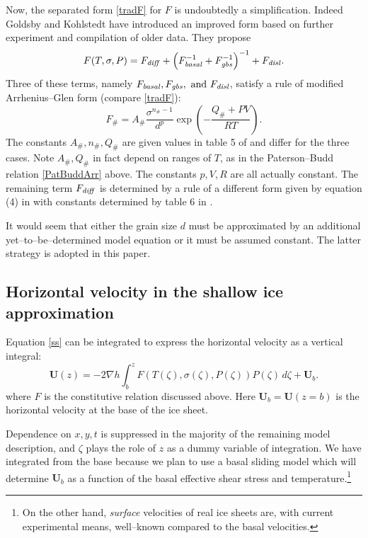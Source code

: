 \documentclass{amsart}%
\theoremstyle{plain}
\theoremstyle{definition}
\theoremstyle{remark}
\newcommand{\grad}{\nabla}
\newcommand{\bU}{{\mathbf{U}}}
\begin{document}
Now, the separated form \eqref{tradF} for $F$ is undoubtedly a simplification.  Indeed Goldsby and Kohlstedt \cite{GoldsbyKohlstedt} have introduced an improved form based on further experiment and compilation of older data.  They propose
\begin{equation}\label{GKF}
F(T,\sigma,P)=F_{\text{\emph{diff}}} + \left(F_{\text{\emph{basal}}}^{-1} + F_{\text{\emph{gbs}}}^{-1}\right)^{-1} +F_{\text{\emph{disl}}}.
\end{equation}
Three of these terms, namely  $F_{\text{\emph{basal}}}, F_{\text{\emph{gbs}}}, \text{ and } F_{\text{\emph{disl}}}$, satisfy a rule of modified Arrhenius--Glen form (compare \eqref{tradF}):
    $$F_{\#}=A_{\#} \frac{\sigma^{n_{\#}-1}}{d^p} \exp\left(-\frac{Q_{\#}+PV}{RT}\right).$$
The constants $A_{\#},n_{\#},Q_{\#}$ are given values in table 5 of \cite{GoldsbyKohlstedt} and differ for the three cases.  Note $A_{\#},Q_{\#}$ in fact depend on ranges of $T$, as in the Paterson--Budd relation \eqref{PatBuddArr} above.  The constants $p, V, R$ are all actually constant.  The remaining term $F_{\text{\emph{diff}}}$ is determined by a rule of a different form given by equation (4) in \cite{GoldsbyKohlstedt} with constants determined by table 6 in \cite{GoldsbyKohlstedt}.

It would seem that either the grain size $d$ must be approximated by an additional yet--to--be--determined model equation or it must be assumed constant.  The latter strategy is adopted in this paper.


\subsection{Horizontal velocity in the shallow ice approximation}\label{ss:horvel}  Equation \eqref{ss} can be integrated to express the horizontal velocity as a vertical integral:
    $$\bU(z) = - 2 \grad h \int_{b}^z F(T(\zeta),\sigma(\zeta),P(\zeta)) P(\zeta)\,d\zeta + \bU_b.$$
where $F$ is the constitutive relation discussed above.  Here $\bU_b=\bU(z=b)$ is the horizontal velocity at the base of the ice sheet.

Dependence on $x,y,t$ is suppressed in the majority of the remaining model description, and $\zeta$ plays the role of $z$ as a dummy variable of integration.  We have integrated from the base because we plan to use a basal sliding model which will determine $\bU_b$ as a function of the basal effective shear stress and temperature.\footnote{On the other hand, \emph{surface} velocities of real ice sheets are, with current experimental means, well--known compared to the basal velocities.}
\end{document}
